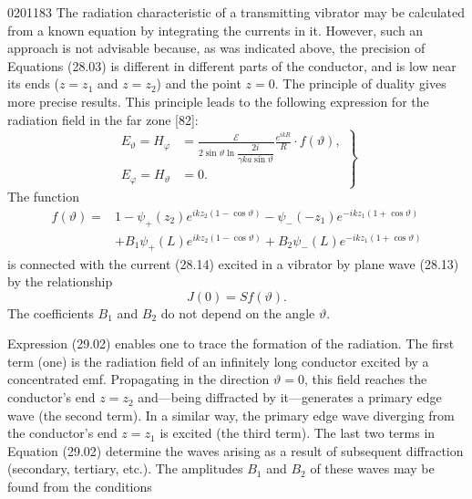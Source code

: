 \begin{scanpage}{0201}{183}
The radiation characteristic of a transmitting vibrator may be calculated from a known equation by integrating the currents in it. However, such an approach is not advisable because, as was indicated above, the precision of Equations (28.03) is different in different parts of the conductor, and is low near its ends ($z=z_1$ and $z=z_2$) and the point $z=0$. The principle of duality gives more precise results. This principle leads to the following expression for the radiation field in the far zone [82]:
\[
\left.\begin{aligned}
E_\vartheta=H_\varphi&=\frac{\mathcal E}{2\sin\vartheta\ln\dfrac{2i}{\gamma ka\sin\vartheta}}\frac{e^{ikR}}R\cdot f(\vartheta),\\
E_\varphi=H_\vartheta&=0.
\end{aligned}\right\}\tag{29.01}
\]
The function
\[
\begin{aligned}
f(\vartheta)={}&1-\psi_+(z_2)e^{ikz_2(1-\cos\vartheta)}-\psi_-(-z_1)e^{-ikz_1(1+\cos\vartheta)}\\
&+B_1\psi_+(L)e^{ikz_2(1-\cos\vartheta)}+B_2\psi_-(L)e^{-ikz_1(1+\cos\vartheta)}
\end{aligned}\tag{29.02}
\]
is connected with the current (28.14) excited in a vibrator by plane wave (28.13) by the relationship
\[J(0)=Sf(\vartheta).\tag{29.03}\]
The coefficients $B_1$ and $B_2$ do not depend on the angle $\vartheta$.

Expression (29.02) enables one to trace the formation of the radiation. The first term (one) is the radiation field of an infinitely long conductor excited by a concentrated emf. Propagating in the direction $\vartheta=0$, this field reaches the conductor's end $z=z_2$ and---being diffracted by it---generates a primary edge wave (the second term). In a similar way, the primary edge wave diverging from the conductor's end $z=z_1$ is excited (the third term). The last two terms in Equation (29.02) determine the waves arising as a result of subsequent diffraction (secondary, tertiary, etc.). The amplitudes $B_1$ and $B_2$ of these waves may be found from the conditions
\end{scanpage}
